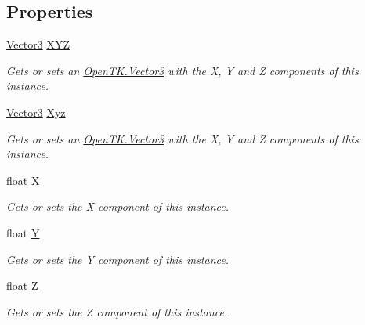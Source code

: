 \subsection*{Properties}
\begin{DoxyCompactItemize}
\item 
\hyperlink{struct_open_t_k_1_1_vector3}{Vector3} \hyperlink{struct_open_t_k_1_1_quaternion_ac93b88de0dfdbc1fc7561717b4c60195}{X\-Y\-Z}
\begin{DoxyCompactList}\small\item\em Gets or sets an \hyperlink{struct_open_t_k_1_1_vector3}{Open\-T\-K.\-Vector3} with the X, Y and Z components of this instance. \end{DoxyCompactList}\item 
\hyperlink{struct_open_t_k_1_1_vector3}{Vector3} \hyperlink{struct_open_t_k_1_1_quaternion_a179592a60e7facac046589a6aabc2d41}{Xyz}
\begin{DoxyCompactList}\small\item\em Gets or sets an \hyperlink{struct_open_t_k_1_1_vector3}{Open\-T\-K.\-Vector3} with the X, Y and Z components of this instance. \end{DoxyCompactList}\item 
float \hyperlink{struct_open_t_k_1_1_quaternion_af928c6d2c5e59f5d771223b1d9c7018b}{X}
\begin{DoxyCompactList}\small\item\em Gets or sets the X component of this instance. \end{DoxyCompactList}\item 
float \hyperlink{struct_open_t_k_1_1_quaternion_aad3fdabef1cdc7fd69a807fd043fe1d3}{Y}
\begin{DoxyCompactList}\small\item\em Gets or sets the Y component of this instance. \end{DoxyCompactList}\item 
float \hyperlink{struct_open_t_k_1_1_quaternion_af184db9f0b3958e0ab8c1ef0eb0667f7}{Z}
\begin{DoxyCompactList}\small\item\em Gets or sets the Z component of this instance. \end{DoxyCompactList}\item 

\end{DoxyCompactItemize}
